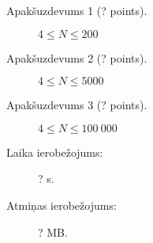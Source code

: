 \documentclass{boi2014-lv}
\begin{document}
    \Scoring

    \begin{description}
        \item[Apakšuzdevums 1 (? points).] $4 \le N \le 200$
        \item[Apakšuzdevums 2 (? points).] $4 \le N \le 5000$
        \item[Apakšuzdevums 3 (? points).] $4 \le N \le 100\ 000$
    \end{description}

    \Constraints

    \begin{description}
        \item[Laika ierobežojums:] ? s.
        \item[Atmiņas ierobežojums:] ? MB.
    \end{description}
\end{document}
